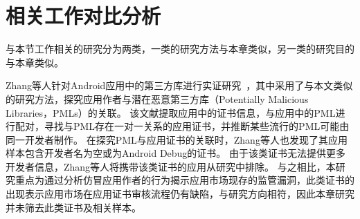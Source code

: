 

\section{相关工作对比分析}

与本节工作相关的研究分为两类，一类的研究方法与本章类似，另一类的研究目的与本章类似。

Zhang等人针对Android应用中的第三方库进行实证研究~\cite{zhang2020empirical}，其中采用了与本文类似的研究方法，探究应用作者与潜在恶意第三方库（Potentially Malicious Libraries，PMLs）的关联。
该文献提取应用中的证书信息，与应用中的PML进行配对，寻找与PML存在一对一关系的应用证书，并推断某些流行的PML可能由同一开发者制作。
在探究PML与应用证书的关联时，Zhang等人也发现了其应用样本包含开发者名为空或为Android Debug的证书。
由于该类证书无法提供更多开发者信息，Zhang等人将携带该类证书的应用从研究中排除。
与之相比，本研究重点为通过分析仿冒应用作者的行为揭示应用市场现存的监管漏洞，此类证书的出现表示应用市场在应用证书审核流程仍有缺陷，与研究方向相符，因此本章研究并未筛去此类证书及相关样本。

